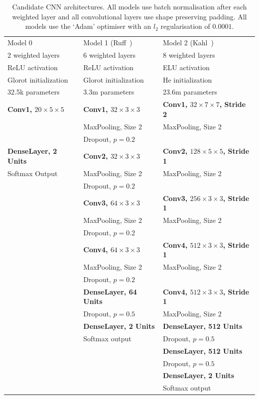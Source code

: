 \begin{table}[hp]
\begin{center}
\begin{tabular}{l l l}
\toprule
Model 0 & Model 1 (Ruff~\cite{ruff2020automated}) & Model 2 (Kahl~\cite{kahl2017large}) \\[0.5ex]
2 weighted layers & 6 weighted layers & 8 weighted layers \\[0.5ex]
ReLU activation & ReLU activation & ELU activation \\[0.5ex]
Glorot initialization & Glorot initialization & He initialization \\[0.5ex]
32.5k parameters & 3.3m parameters & 23.6m parameters \\[0.5ex]
\midrule
\textbf{Conv1, $20 \times 5 \times 5$} &
\textbf{Conv1, $32 \times 3 \times 3$} &
\textbf{Conv1, $32 \times 7 \times 7$, Stride 2} \\
& MaxPooling, Size 2 & MaxPooling, Size 2 \\
& Dropout, $p=0.2$ & \\[1ex]
\textbf{DenseLayer, 2 Units} &
\textbf{Conv2, $32 \times 3 \times 3$} &
\textbf{Conv2, $128 \times 5 \times 5$, Stride 1} \\
Softmax Output & MaxPooling, Size 2 & MaxPooling, Size 2 \\
& Dropout, $p=0.2$ & \\[1ex]
& \textbf{Conv3, $64 \times 3 \times 3$} &
\textbf{Conv3, $256 \times 3 \times 3$, Stride 1} \\
& MaxPooling, Size 2 & MaxPooling, Size 2 \\
& Dropout, $p=0.2$ & \\[1ex]
& \textbf{Conv4, $64 \times 3 \times 3$} &
\textbf{Conv4, $512 \times 3 \times 3$, Stride 1} \\
& MaxPooling, Size 2 & MaxPooling, Size 2 \\
& Dropout, $p=0.2$ & \\[1ex]
& \textbf{DenseLayer, 64 Units} &
\textbf{Conv4, $512 \times 3 \times 3$, Stride 1} \\
& Dropout, $p=0.5$ & MaxPooling, Size 2 \\[1ex]
& \textbf{DenseLayer, 2 Units} &
\textbf{DenseLayer, 512 Units} \\
& Softmax output & Dropout, $p=0.5$ \\[1ex]
& & \textbf{DenseLayer, 512 Units} \\
& & Dropout, $p=0.5$ \\[1ex]
& & \textbf{DenseLayer, 2 Units} \\
& & Softmax output \\[1ex]
\bottomrule
\end{tabular}
\caption{Candidate CNN architectures. All models use batch normalisation after
each weighted layer and all convolutional layers use shape preserving
padding. All models use the `Adam' optimiser with an $l_2$ regularisation of
$0.0001$.}\label{table:cnn_architectures}
\end{center}
\end{table}

